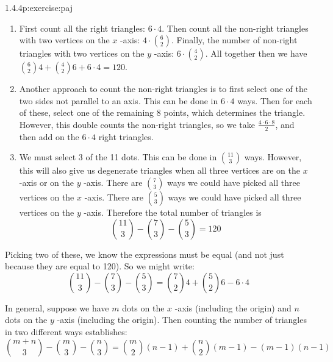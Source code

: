 \documentclass[twoside,11pt,]{book}
\numberwithin{equation}{chapter}
\begin{document}
\begin{divisionsolution}{1.4.4}{}{p:exercise:paj}
\begin{enumerate}[label=(\alph*)]
\begin{equation*}
\end{equation*}
%
\item{}First count all the right triangles: \(6 \cdot 4\). Then count all the non-right triangles with two vertices on the \(x\) -axis: \(4 \cdot {6 \choose 2}\). Finally, the number of non-right triangles with two vertices on the \(y\) -axis: \(6 \cdot {4 \choose 2}\). All together then we have \({6 \choose 2}4 + {4 \choose 2}6 + 6 \cdot 4 = 120\).%
\item{}Another approach to count the non-right triangles is to first select one of the two sides not parallel to an axis. This can be done in \(6 \cdot 4\) ways. Then for each of these, select one of the remaining 8 points, which determines the triangle. However, this double counts the non-right triangles, so we take \(\frac{4\cdot 6 \cdot 8}{2}\), and then add on the \(6\cdot 4\) right triangles.%
\item{}We must select 3 of the 11 dots. This can be done in \({11 \choose 3}\) ways. However, this will also give us degenerate triangles when all three vertices are on the \(x\) -axis or on the \(y\) -axis. There are \({7 \choose 3}\) ways we could have picked all three vertices on the \(x\) -axis. There are \({5 \choose 3}\) ways we could have picked all three vertices on the \(y\) -axis. Therefore the total number of triangles is%
\begin{equation*}
{11 \choose 3} - {7 \choose 3} - {5 \choose 3} = 120
\end{equation*}
%
\end{enumerate}
%
\par
Picking two of these, we know the expressions must be equal (and not just because they are equal to 120). So we might write:%
\begin{equation*}
{11 \choose 3} - {7 \choose 3} - {5 \choose 3} = {7 \choose 2}4 + {5 \choose 2}6 - 6\cdot 4
\end{equation*}
%
\par
In general, suppose we have \(m\) dots on the \(x\) -axis (including the origin) and \(n\) dots on the \(y\) -axis (including the origin). Then counting the number of triangles in two different ways establishes:%
\begin{equation*}
{m+n \choose 3} - {m \choose 3} - {n \choose 3} = {m \choose 2}(n-1) + {n \choose 2}(m-1) - (m-1)(n-1)
\end{equation*}
%
\end{divisionsolution}%
\end{document}

